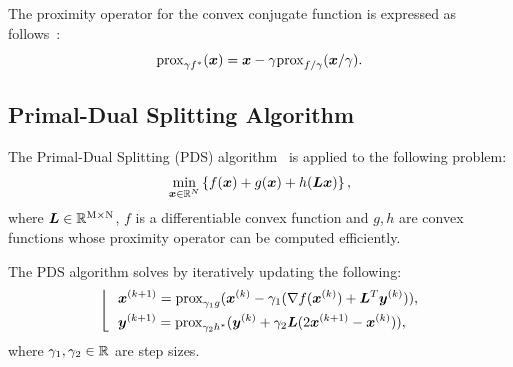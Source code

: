 The proximity operator for the convex conjugate function is expressed as follows~\cite[Theorem 3.1 (ii)]{prox-convex-conjugate-function}:
\begin{equation} \label{eq:ProximityOperatorDefinitionWithConvexConjugateFunctionEq} \mathrm{prox}_{ \gamma f^* }(\bm{x}) = \bm{x} - \gamma \mathrm{prox}_{ f / \gamma }(\bm{x} / \gamma). \end{equation}


\subsection{Primal-Dual Splitting Algorithm}\label{subsec:primal-dual-splitting-algorithm}
The Primal-Dual Splitting (PDS) algorithm~\cite{PDS0,PDS1,PDS2,PDS3} is applied to the following problem:
\begin{equation} \label{eq:PDSPrimalEq} \underset{ \bm{x} \in \mathbb{R}^N }{\mathrm{min}} \left\{ f(\bm{x}) + g(\bm{x}) + h(\bm{L} \bm{x}) \right\}, \end{equation}
where $\bm{L} \in \mathbb{R}^{\mathrm{M} \times \mathrm{N}}$, $f$ is a differentiable convex function and $g,h$ are convex functions whose proximity operator can be computed efficiently.

The PDS algorithm solves by iteratively updating the following:
\begin{equation} \label{eq:PDSSubStep} \left \lfloor \ \ \begin{aligned} & \bm{x}^{(k+1)} = \mathrm{prox}_{\gamma_1 g}(\bm{x}^{(k)} - \gamma_1( \nabla f(\bm{x}^{(k)}) + \bm{L}^T \bm{y}^{(k)} )), \\ & \bm{y}^{(k+1)} = \mathrm{prox}_{\gamma_2 h^*}(\bm{y}^{(k)} + \gamma_2 \bm{L} (2\bm{x}^{(k+1)} - \bm{x}^{(k)}) ), \\ \end{aligned} \right. \end{equation}
where $\gamma_1, \gamma_2 \in \mathbb{R}$ are step sizes.


